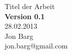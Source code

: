 \begin{titlepage}
	\vspace*{7cm}
	\begin{center}
		\Huge
		Titel der Arbeit\\
		\vspace{1cm}
		\large
		\textbf{Version 0.1}\\
		28.02.2013\\
		\vspace{2cm}
		Jon Barg \\
		jon.barg@gmail.com
	\end{center}
	\normalsize
	\vfill
	
	
\end{titlepage}





%
%
